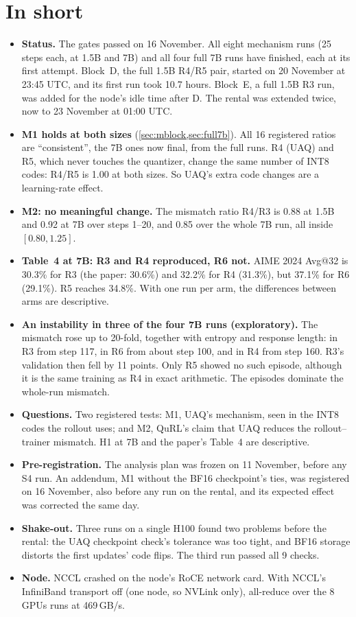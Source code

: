 \documentclass[11pt]{article}
\begin{document}
\section*{In short}
\begin{itemize}
\item \textbf{Status.} The gates passed on 16 November. All eight mechanism runs (25 steps each, at 1.5B and 7B) and all four full 7B runs have finished, each at its first attempt. Block~D, the full 1.5B R4/R5 pair, started on 20 November at 23:45 UTC, and its first run took 10.7 hours. Block~E, a full 1.5B R3 run, was added for the node's idle time after D. The rental was extended twice, now to 23 November at 01:00 UTC.
\item \textbf{M1 holds at both sizes} (\cref{sec:mblock,sec:full7b}). All 16 registered ratios are ``consistent'', the 7B ones now final, from the full runs. R4 (UAQ) and R5, which never touches the quantizer, change the same number of INT8 codes: R4/R5 is 1.00 at both sizes. So UAQ's extra code changes are a learning-rate effect.
\item \textbf{M2: no meaningful change.} The mismatch ratio R4/R3 is 0.88 at 1.5B and 0.92 at 7B over steps 1--20, and 0.85 over the whole 7B run, all inside $[0.80,1.25]$.
\item \textbf{Table~4 at 7B: R3 and R4 reproduced, R6 not.} AIME 2024 Avg@32 is 30.3\% for R3 (the paper: 30.6\%) and 32.2\% for R4 (31.3\%), but 37.1\% for R6 (29.1\%). R5 reaches 34.8\%. With one run per arm, the differences between arms are descriptive.
\item \textbf{An instability in three of the four 7B runs (exploratory).} The mismatch rose up to 20-fold, together with entropy and response length: in R3 from step 117, in R6 from about step 100, and in R4 from step 160. R3's validation then fell by 11 points. Only R5 showed no such episode, although it is the same training as R4 in exact arithmetic. The episodes dominate the whole-run mismatch.
\item \textbf{Questions.} Two registered tests: M1, UAQ's mechanism, seen in the INT8 codes the rollout uses; and M2, QuRL's claim that UAQ reduces the rollout--trainer mismatch. H1 at 7B and the paper's Table~4 are descriptive.
\item \textbf{Pre-registration.} The analysis plan was frozen on 11 November, before any S4 run. An addendum, M1 without the BF16 checkpoint's ties, was registered on 16 November, also before any run on the rental, and its expected effect was corrected the same day.
\item \textbf{Shake-out.} Three runs on a single H100 found two problems before the rental: the UAQ checkpoint check's tolerance was too tight, and BF16 storage distorts the first updates' code flips. The third run passed all 9 checks.
\item \textbf{Node.} NCCL crashed on the node's RoCE network card. With NCCL's InfiniBand transport off (one node, so NVLink only), all-reduce over the 8 GPUs runs at 469\,GB/s.
\end{itemize}
\end{document}

